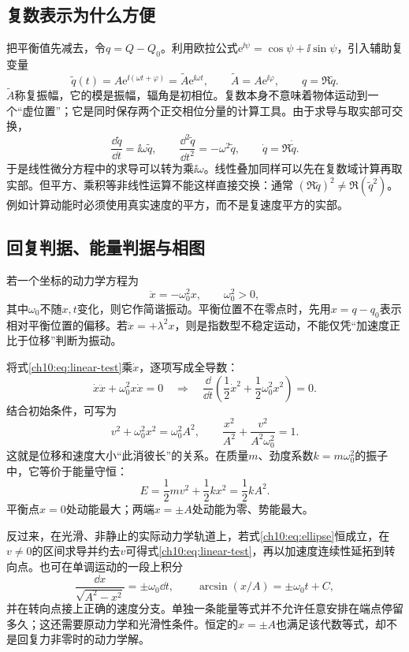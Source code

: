 \subsection{复数表示为什么方便}
把平衡值先减去，令$q=Q-Q_0$。利用欧拉公式$\mathrm e^{\ii\psi}=\cos\psi+\ii\sin\psi$，引入辅助复变量
\[
 \widetilde q(t)=A\mathrm e^{\ii(\omega t+\varphi)}
 =\widetilde A\mathrm e^{\ii\omega t},\qquad
 \widetilde A=A\mathrm e^{\ii\varphi},\qquad q=\Re\widetilde q.
\]
$\widetilde A$称复振幅，它的模是振幅，辐角是初相位。复数本身不意味着物体运动到一个“虚位置”；它是同时保存两个正交相位分量的计算工具。由于求导与取实部可交换，
\[
 \frac{\dd\widetilde q}{\dd t}=\ii\omega\widetilde q,
 \qquad \frac{\dd^2\widetilde q}{\dd t^2}=-\omega^2\widetilde q,
 \qquad \dot q=\Re\dot{\widetilde q}.
\]
于是线性微分方程中的求导可以转为乘$\ii\omega$。线性叠加同样可以先在复数域计算再取实部。但平方、乘积等非线性运算不能这样直接交换：通常
$(\Re\widetilde q)^2\ne\Re(\widetilde q^{2})$。例如计算动能时必须使用真实速度的平方，而不是复速度平方的实部。

\subsection{回复判据、能量判据与相图}
若一个坐标的动力学方程为
\begin{equation}\label{ch10:eq:linear-test}
 \ddot x=-\omega_0^2x,\qquad\omega_0^2>0,
\end{equation}
其中$\omega_0$不随$x,t$变化，则它作简谐振动。平衡位置不在零点时，先用$x=q-q_0$表示相对平衡位置的偏移。若$\ddot x=+\lambda^2x$，则是指数型不稳定运动，不能仅凭“加速度正比于位移”判断为振动。

将式\eqref{ch10:eq:linear-test}乘$\dot x$，逐项写成全导数：
\[
 \dot x\ddot x+\omega_0^2x\dot x=0
 \quad\Longrightarrow\quad
 \frac{\dd}{\dd t}\left(\frac12\dot x^2+\frac12\omega_0^2x^2\right)=0.
\]
结合初始条件，可写为
\begin{equation}\label{ch10:eq:ellipse}
 v^2+\omega_0^2x^2=\omega_0^2A^2,
 \qquad \frac{x^2}{A^2}+\frac{v^2}{A^2\omega_0^2}=1.
\end{equation}
这就是位移和速度大小“此消彼长”的关系。在质量$m$、劲度系数$k=m\omega_0^2$的振子中，它等价于能量守恒：
\begin{equation}\label{ch10:eq:energy}
 E=\frac12mv^2+\frac12kx^2=\frac12kA^2.
\end{equation}
平衡点$x=0$处动能最大；两端$x=\pm A$处动能为零、势能最大。

反过来，在光滑、非静止的实际动力学轨道上，若式\eqref{ch10:eq:ellipse}恒成立，在$v\ne0$的区间求导并约去$v$可得式\eqref{ch10:eq:linear-test}，再以加速度连续性延拓到转向点。也可在单调运动的一段上积分
\[
 \frac{\dd x}{\sqrt{A^2-x^2}}=\pm\omega_0\dd t,
 \qquad \arcsin(x/A)=\pm\omega_0t+C,
\]
并在转向点接上正确的速度分支。单独一条能量等式并不允许任意安排在端点停留多久；这还需要原动力学和光滑性条件。恒定的$x=\pm A$也满足该代数等式，却不是回复力非零时的动力学解。

